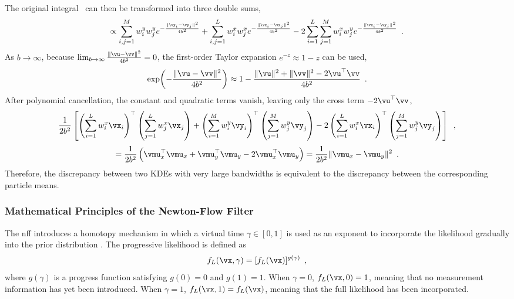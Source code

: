 The original integral~ can then be transformed into three double sums,
\begin{equation}
	\propto \sum_{i,j=1}^M w_i^y w_j^y e^{-\frac{\|\vy_i - \vy_j\|^2}{4b^2}} + \sum_{i,j=1}^L w_i^x w_j^x e^{-\frac{\|\vx_i - \vx_j\|^2}{4b^2}} - 2 \sum_{i=1}^L \sum_{j=1}^M w_i^x w_j^y e^{-\frac{\|\vx_i - \vy_j\|^2}{4b^2}} \enspace.
\end{equation}
As $b \to \infty$, because $\lim_{b \to \infty} \frac{\|\vu - \vv\|^2}{4b^2} = 0$, the first-order Taylor expansion $e^{-z} \approx 1 - z$ can be used,
\begin{equation}
	\exp\!\left(-\frac{\|\vu - \vv\|^2}{4b^2}\right) \approx 1 - \frac{\|\vu\|^2 + \|\vv\|^2 - 2\vu^{\top}\vv}{4b^2} \enspace.
\end{equation}
After polynomial cancellation, the constant and quadratic terms vanish, leaving only the cross term $-2\vu^{\top}\vv$,
\begin{equation}
	\frac{1}{2b^2} \left[ \left( \sum_{i=1}^L w_i^x \vx_i \right)^\top \left( \sum_{j=1}^L w_j^x \vx_j \right) + \left( \sum_{i=1}^M w_i^y \vy_i \right)^\top \left( \sum_{j=1}^M w_j^y \vy_j \right) - 2 \left( \sum_{i=1}^L w_i^x \vx_i \right)^\top \left( \sum_{j=1}^M w_j^y \vy_j \right) \right] \enspace,
\end{equation}
\begin{equation}
	= \frac{1}{2b^2} \left( \vmu_x^{\top} \vmu_x + \vmu_y^{\top} \vmu_y - 2\vmu_x^{\top} \vmu_y \right) = \frac{1}{2b^2} \|\vmu_x - \vmu_y\|^2 \enspace.
\end{equation}
Therefore, the discrepancy between two KDEs with very large bandwidths is equivalent to the discrepancy between the corresponding particle means.

\subsubsection{Mathematical Principles of the Newton-Flow Filter}
\label{subsubsec:newtonflow_principles}

The \ac{nff} introduces a homotopy mechanism in which a virtual time $\gamma \in [0,1]$ is used as an exponent to incorporate the likelihood gradually into the prior distribution \cite{NFF}. The progressive likelihood is defined as
\begin{equation}
	f_L(\vx, \gamma) = [f_L(\vx)]^{g(\gamma)} \enspace,
\end{equation}
where $g(\gamma)$ is a progress function satisfying $g(0)=0$ and $g(1)=1$. When $\gamma=0$, $f_L(\vx,0)=1$, meaning that no measurement information has yet been introduced. When $\gamma=1$, $f_L(\vx,1)=f_L(\vx)$, meaning that the full likelihood has been incorporated.

